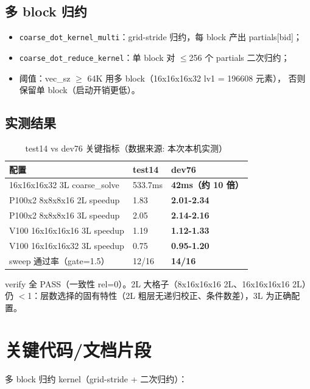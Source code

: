 \documentclass[UTF8]{ctexart}
\begin{document}
\subsection{多 block 归约}
\begin{itemize}
\item \texttt{coarse\_dot\_kernel\_multi}：grid-stride 归约，每 block 产出
  partials[bid]；
\item \texttt{coarse\_dot\_reduce\_kernel}：单 block 对 $\le$256 个 partials
  二次归约；
\item 阈值：vec\_sz $\ge$ 64K 用多 block（16x16x16x32 lv1 = 196608 元素），
  否则保留单 block（启动开销更低）。
\end{itemize}

\subsection{实测结果}
\begin{table}[htbp]\centering
\begin{tabular}{lll}
\toprule
配置 & test14 & dev76 \\
\midrule
16x16x16x32 3L coarse\_solve & 533.7ms & \textbf{42ms（约 10 倍）} \\
P100x2 8x8x8x16 2L speedup & 1.83 & \textbf{2.01-2.34} \\
P100x2 8x8x8x16 3L speedup & 2.05 & \textbf{2.14-2.16} \\
V100 16x16x16x16 3L speedup & 1.19 & \textbf{1.12-1.33} \\
V100 16x16x16x32 3L speedup & 0.75 & \textbf{0.95-1.20} \\
sweep 通过率（gate=1.5） & 12/16 & \textbf{14/16} \\
\bottomrule
\end{tabular}
\caption{test14 vs dev76 关键指标（数据来源: 本次本机实测）}
\end{table}

verify 全 PASS（一致性 rel=0）。2L 大格子（8x16x16x16 2L、16x16x16x16 2L）
仍 $<$1：层数选择的固有特性（2L 粗层无递归校正、条件数差），3L 为正确配置。

\section{关键代码/文档片段}
多 block 归约 kernel（grid-stride + 二次归约）：

\end{document}
